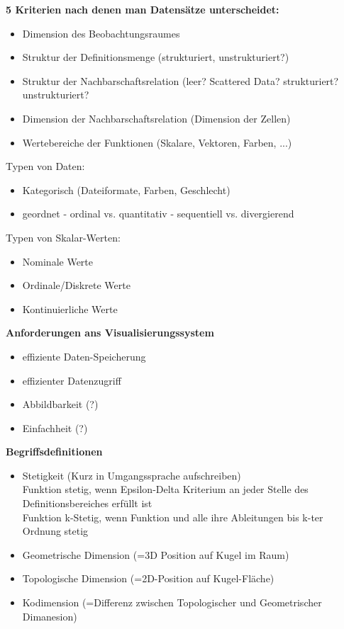 \documentclass{article}
\begin{document}
\noindent \textbf{5 Kriterien nach denen man Datensätze unterscheidet:}
\begin{itemize}[noitemsep]
	\item Dimension des Beobachtungsraumes
	\item Struktur der Definitionsmenge (strukturiert, unstrukturiert?)
	\item Struktur der Nachbarschaftsrelation (leer? Scattered Data? strukturiert? unstrukturiert?
	\item Dimension der Nachbarschaftsrelation (Dimension der Zellen)
	\item Wertebereiche der Funktionen (Skalare, Vektoren, Farben, ...)
\end{itemize}

\noindent Typen von Daten:
\begin{itemize}[noitemsep]
	\item Kategorisch (Dateiformate, Farben, Geschlecht)
	\item geordnet
	\subitem - ordinal vs. quantitativ
	\subitem - sequentiell vs. divergierend
\end{itemize}

\noindent Typen von Skalar-Werten:
\begin{itemize}[noitemsep]
	\item Nominale Werte 
	\item Ordinale/Diskrete Werte
	\item Kontinuierliche Werte
\end{itemize}

\noindent \textbf{Anforderungen ans Visualisierungssystem}
\begin{itemize}[noitemsep]
	\item effiziente Daten-Speicherung
	\item effizienter Datenzugriff
	\item Abbildbarkeit (?)
	\item Einfachheit (?)
\end{itemize}

\noindent \textbf{Begriffsdefinitionen}
\begin{itemize}[noitemsep]
	\item Stetigkeit (Kurz in Umgangssprache aufschreiben)\\
	Funktion stetig, wenn Epsilon-Delta Kriterium an jeder Stelle des Definitionsbereiches erfüllt ist\\
	Funktion k-Stetig, wenn Funktion und alle ihre Ableitungen bis k-ter Ordnung stetig 
	\item Geometrische Dimension (=3D Position auf Kugel im Raum)
	\item Topologische Dimension (=2D-Position auf Kugel-Fläche) 	
	\item Kodimension (=Differenz zwischen Topologischer und Geometrischer Dimanesion)
\end{itemize}
\end{document}
